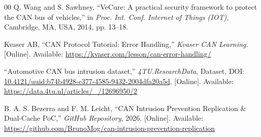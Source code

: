 \documentclass[conference]{IEEEtran}
\begin{document}
\begin{thebibliography}{00}
Q. Wang and S. Sawhney, ``VeCure: A practical security framework to protect the CAN bus of vehicles,'' in \textit{Proc. Int. Conf. Internet of Things (IOT)}, Cambridge, MA, USA, 2014, pp. 13--18.

Kvaser AB, ``CAN Protocol Tutorial: Error Handling,'' \textit{Kvaser CAN Learning}. [Online]. Available: \url{https://kvaser.com/lesson/can-error-handling/}

``Automotive CAN bus intrusion dataset,'' \textit{4TU.ResearchData}, Dataset, DOI: \url{10.4121/uuid:b74b4928-c377-4585-9432-2004dfa20a5d}. [Online]. Available: \url{https://data.4tu.nl/articles/_/12696950/2}

B. A. S. Bezerra and F. M. Leicht, ``CAN Intrusion Prevention Replication \& Dual-Cache PoC,'' \textit{GitHub Repository}, 2026. [Online]. Available: \url{https://github.com/BrunoMog/can-intrusion-prevention-replication}

\end{thebibliography}
\end{document}

